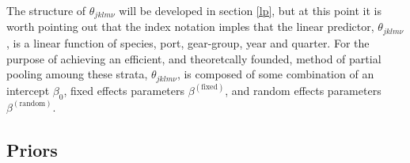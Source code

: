 \documentclass[12pt]{article}
\begin{document}
%
The structure of \(\theta_{jklm\nu}\) will be developed in section \ref{lp}, 
but at this point it is worth pointing out that the index notation imples that
the linear predictor, \(\theta_{jklm\nu}\), is a linear function of species, 
port, gear-group, year and quarter. For the purpose of achieving an efficient, 
and theoretcally founded, method of partial pooling amoung these strata, 
\(\theta_{jklm\nu}\), is composed of some combination of an intercept $\beta_0$, 
fixed effects parameters $\beta^{(\text{fixed})}$, and random effects parameters 
$\beta^{(\text{random})}$. 


%

%
%
\subsection{Priors}\label{priors}
%
%
\end{document}
